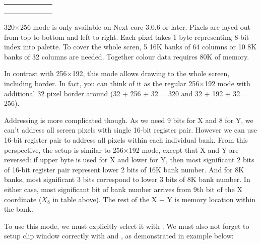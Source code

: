 \begin{multicols}{2}
	\begin{tabularx}{0.445\textwidth}{|c|c|c|c|c|Y|}
		\hline
		 &
			 &
			 &
			 &
			 &
			 \\
		\hline
		 & 
			 &
			 \\
		\hline
		 &
			 &
			 \\
		\hline
		 &
			 &
			 \\
		\hline
	\end{tabularx}
\end{multicols}

320$\times$256 mode is only available on Next core 3.0.6 or later. Pixels are layed out from top to bottom and left to right. Each pixel takes 1 byte representing 8-bit index into palette. To cover the whole scren, 5 16K banks of 64 columns or 10 8K banks of 32 columns are needed. Together colour data requires 80K of memory.

In contrast with 256$\times$192, this mode allows drawing to the whole screen, including border. In fact, you can think of it as the regular 256$\times$192 mode with additional 32 pixel border around (32 + 256 + 32 = 320 and 32 + 192 + 32 = 256).

Addressing is more complicated though. As we need 9 bits for X and 8 for Y, we can't address all screen pixels with single 16-bit register pair. However we can use 16-bit register pair to address all pixels within each individual bank. From this perspective, the setup is similar to 256$\times$192 mode, except that X and Y are reversed: if upper byte is used for X and lower for Y, then most significant 2 bits of 16-bit register pair represent lower 2 bits of 16K bank number. And for 8K banks, most significant 3 bits correspond to lower 3 bits of 8K bank number. In either case, most significant bit of bank number arrives from 9th bit of the X coordinate ($X_8$ in table above). The rest of the X + Y is memory location within the bank.

To use this mode, we must explicitly select it with . We must also not forget to setup clip window correctly with  and , as demonstrated in example below:


